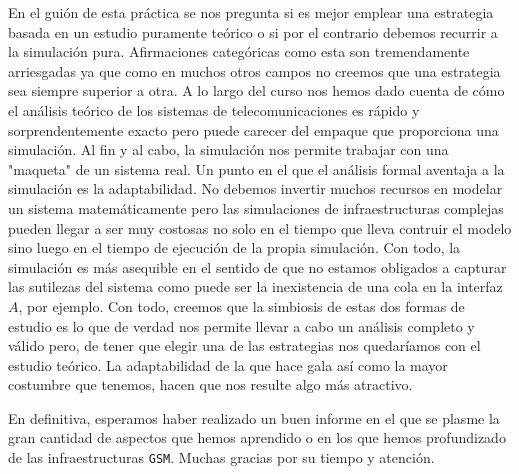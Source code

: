 \documentclass[10pt]{article}
\begin{document}
		En el guión de esta práctica se nos pregunta si es mejor emplear una estrategia basada en un estudio puramente teórico o si por el contrario debemos recurrir a la simulación pura. Afirmaciones categóricas como esta son tremendamente arriesgadas ya que como en muchos otros campos no creemos que una estrategia sea siempre superior a otra. A lo largo del curso nos hemos dado cuenta de cómo el análisis teórico de los sistemas de telecomunicaciones es rápido y sorprendentemente exacto pero puede carecer del empaque que proporciona una simulación. Al fin y al cabo, la simulación nos permite trabajar con una "maqueta" de un sistema real. Un punto en el que el análisis formal aventaja a la simulación es la adaptabilidad. No debemos invertir muchos recursos en modelar un sistema matemáticamente pero las simulaciones de infraestructuras complejas pueden llegar a ser muy costosas no solo en el tiempo que lleva contruir el modelo sino luego en el tiempo de ejecución de la propia simulación. Con todo, la simulación es más asequible en el sentido de que no estamos obligados a capturar las sutilezas del sistema como puede ser la inexistencia de una cola en la interfaz $A$, por ejemplo. Con todo, creemos que la simbiosis de estas dos formas de estudio es lo que de verdad nos permite llevar a cabo un análisis completo y válido pero, de tener que elegir una de las estrategias nos quedaríamos con el estudio teórico. La adaptabilidad de la que hace gala así como la mayor costumbre que tenemos, hacen que nos resulte algo más atractivo.

		En definitiva, esperamos haber realizado un buen informe en el que se plasme la gran cantidad de aspectos que hemos aprendido o en los que hemos profundizado de las infraestructuras \texttt{GSM}. Muchas gracias por su tiempo y atención.
\end{document}
